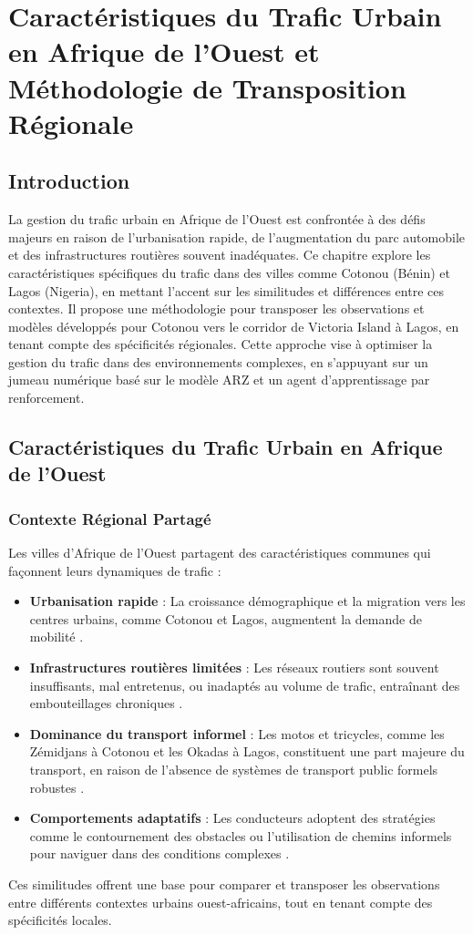 

\chapter{Caractéristiques du Trafic Urbain en Afrique de l'Ouest et Méthodologie de Transposition Régionale}
\label{chap:caracteristiques_transposition}

\section{Introduction}
La gestion du trafic urbain en Afrique de l'Ouest est confrontée à des défis majeurs en raison de l'urbanisation rapide, de l'augmentation du parc automobile et des infrastructures routières souvent inadéquates. Ce chapitre explore les caractéristiques spécifiques du trafic dans des villes comme Cotonou (Bénin) et Lagos (Nigeria), en mettant l'accent sur les similitudes et différences entre ces contextes. Il propose une méthodologie pour transposer les observations et modèles développés pour Cotonou vers le corridor de Victoria Island à Lagos, en tenant compte des spécificités régionales. Cette approche vise à optimiser la gestion du trafic dans des environnements complexes, en s'appuyant sur un jumeau numérique basé sur le modèle ARZ et un agent d'apprentissage par renforcement.

\section{Caractéristiques du Trafic Urbain en Afrique de l'Ouest}

\subsection{Contexte Régional Partagé}
Les villes d'Afrique de l'Ouest partagent des caractéristiques communes qui façonnent leurs dynamiques de trafic :
\begin{itemize}
    \item \textbf{Urbanisation rapide} : La croissance démographique et la migration vers les centres urbains, comme Cotonou et Lagos, augmentent la demande de mobilité \cite{kumar2011urban}.
    \item \textbf{Infrastructures routières limitées} : Les réseaux routiers sont souvent insuffisants, mal entretenus, ou inadaptés au volume de trafic, entraînant des embouteillages chroniques \cite{gomina2013urban}.
    \item \textbf{Dominance du transport informel} : Les motos et tricycles, comme les Zémidjans à Cotonou et les Okadas à Lagos, constituent une part majeure du transport, en raison de l'absence de systèmes de transport public formels robustes \cite{atakiti2016traffic}.
    \item \textbf{Comportements adaptatifs} : Les conducteurs adoptent des stratégies comme le contournement des obstacles ou l'utilisation de chemins informels pour naviguer dans des conditions complexes \cite{atakiti2016traffic}.
\end{itemize}
Ces similitudes offrent une base pour comparer et transposer les observations entre différents contextes urbains ouest-africains, tout en tenant compte des spécificités locales.

